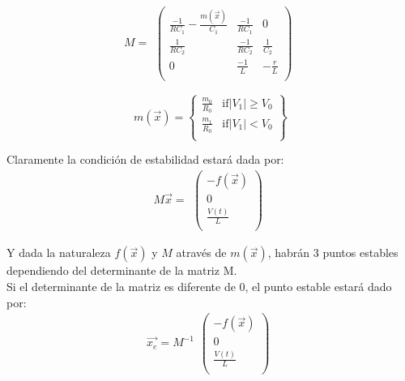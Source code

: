 \documentclass[%
 reprint,
 amsmath,amssymb,
 aps,
]{revtex4-1}
\begin{document}
\begin{equation}
M = \begin{matrix}
	\begin{pmatrix}
	\frac{-1}{RC_1}- \frac{m(\vec{x})}{C_1} &\frac{-1}{RC_1}& 0\\
	\frac{1}{RC_2} & \frac{-1}{RC_2} & \frac{1}{C_2}\\
	0 & \frac{-1}{L} & -\frac{r}{L}\\
	\end{pmatrix}
	\end{matrix}
\end{equation}

\begin{equation}
 m(\vec{x}) = 
 \left\{
	\begin{array}{lll}
		\frac{m_0}{R_0} & \mbox{if} |V_1| \geq V_0 \\
		\frac{m_1}{R_0}	& \mbox{if} |V_1| < V_0 \\
	\end{array}
	\right\}
\end{equation}

Claramente la condición de estabilidad estará dada por:\\

\begin{equation}
M\vec{x} =
\begin{matrix}
	\begin{pmatrix}
	-f(\vec{x})\\
	0\\
	\frac{V(t)}{L}\\
	\end{pmatrix}
	\end{matrix}
\end{equation}

 Y dada la naturaleza $f(\vec{x})$ y $M$ através de $m(\vec{x})$, habrán 3 puntos estables dependiendo del determinante de la matriz M.\\
 
Si el determinante de la matriz es diferente de 0, el punto estable estará dado por:\\
\begin{equation}
\vec{x_e} = M^{-1}
\begin{matrix}
	\begin{pmatrix}
	-f(\vec{x})\\
	0\\
	\frac{V(t)}{L}\\
	\end{pmatrix}
	\end{matrix}
\end{equation}
\end{document}
